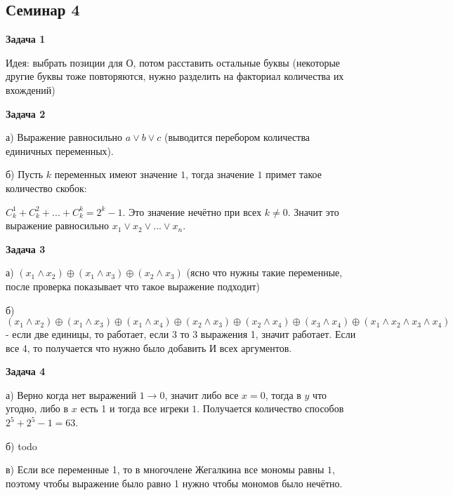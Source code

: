 \subsection{Семинар 4}
\begin{center}
\textbf{Задача 1}
\end{center}
Идея: выбрать позиции для О, потом расставить остальные буквы (некоторые другие буквы тоже повторяются, нужно разделить на факториал количества их вхождений)

\begin{center}
\textbf{Задача 2}
\end{center}
а) Выражение равносильно $\displaystyle a\lor b\lor c$ (выводится перебором количества единичных переменных).

б) Пусть $\displaystyle k$ переменных имеют значение $\displaystyle 1$, тогда значение $\displaystyle 1$ примет такое количество скобок:

$\displaystyle C_{k}^{1} +C_{k}^{2} +...+C_{k}^{k} =2^{k} -1$. Это значение нечётно при всех $\displaystyle k\neq 0$. Значит это выражение равносильно $\displaystyle x_{1} \lor x_{2} \lor ...\lor x_{n}$.

\begin{center}
\textbf{Задача 3}
\end{center}
а) $\displaystyle ( x_{1} \land x_{2}) \oplus ( x_{1} \land x_{3}) \oplus ( x_{2} \land x_{3})$ (ясно что нужны такие переменные, после проверка показывает что такое выражение подходит)

б) $\displaystyle ( x_{1} \land x_{2}) \oplus ( x_{1} \land x_{3}) \oplus ( x_{1} \land x_{4}) \oplus ( x_{2} \land x_{3}) \oplus ( x_{2} \land x_{4}) \oplus ( x_{3} \land x_{4}) \oplus ( x_{1} \land x_{2} \land x_{3} \land x_{4})$ - если две единицы, то работает, если 3 то 3 выражения 1, значит работает. Если все 4, то получается что нужно было добавить И всех аргументов.

\begin{center}
\textbf{Задача 4}
\end{center}
а) Верно когда нет выражений $\displaystyle 1\rightarrow 0$, значит либо все $\displaystyle x=0$, тогда в $\displaystyle y$ что угодно, либо в $\displaystyle x$ есть 1 и тогда все игреки $\displaystyle 1$. Получается количество способов $\displaystyle 2^{5} +2^{5} -1=63$.

б) todo

в) Если все переменные 1, то в многочлене Жегалкина все мономы равны $\displaystyle 1$, поэтому чтобы выражение было равно 1 нужно чтобы мономов было нечётно.


